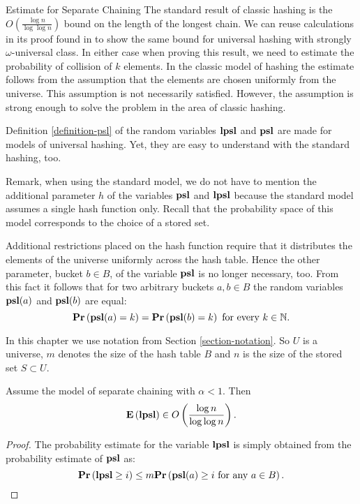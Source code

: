 \begin{section}{Estimate for Separate Chaining}
The standard result of classic hashing is the $O\left(\frac{\log n}{\log \log n}\right)$ bound on the length of the longest chain. We can reuse calculations in its proof found in \cite{DBLP:books/sp/Mehlhorn84} to show the same bound for universal hashing with strongly $\omega$-universal class. In either case when proving this result, we need to estimate the probability of collision of $k$ elements. In the classic model of hashing the estimate follows from the assumption that the elements are chosen uniformly from the universe. This assumption is not necessarily satisfied. However, the assumption is strong enough to solve the problem in the area of classic hashing. 

Definition \ref{definition-psl} of the random variables $\mathbf{lpsl}$ and $\mathbf{psl}$ are made for models of universal hashing. Yet, they are easy to understand with the standard hashing, too. 

Remark, when using the standard model, we do not have to mention the additional parameter $h$ of the variables $\mathbf{psl}$ and $\mathbf{lpsl}$ because the standard model assumes a single hash function only. Recall that the probability space of this model corresponds to the choice of a stored set. 

Additional restrictions placed on the hash function require that it distributes the elements of the universe uniformly across the hash table. Hence the other parameter, bucket $b \in B$, of the variable $\mathbf{psl}$ is no longer necessary, too. From this fact it follows that for two arbitrary buckets $a, b \in B$ the random variables $\mathbf{psl}(a)$ and $\mathbf{psl}(b)$ are equal: \[\mathbf{Pr}\left(\mathbf{psl}(a) = k\right) = \mathbf{Pr}\left(\mathbf{psl}(b) = k\right) \text{ for every } k \in \mathbb{N} \text{.}\] 

In this chapter we use notation from Section \ref{section-notation}. So $U$ is a universe, $m$ denotes the size of the hash table $B$ and $n$ is the size of the stored set $S \subset U$.

\begin{theorem}
Assume the model of separate chaining with $\alpha < 1$. Then 
\[
\mathbf{E}\left(\mathbf{lpsl}\right) \in O\left(\frac{\log n}{\log \log n}\right) \text{.}
\]
\end{theorem}
\begin{proof}
The probability estimate for the variable $\mathbf{lpsl}$ is simply obtained from the probability estimate of $\mathbf{psl}$ as:
\begin{displaymath}
\mathbf{Pr}\left(\mathbf{lpsl} \geq i\right) \leq m \mathbf{Pr}\left(\mathbf{psl}(a) \geq i \text{ for any } a \in B\right) \text{.}
\end{displaymath}


\end{proof}
\end{section}
